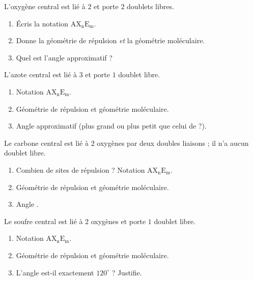 \documentclass[11pt,a4paper]{article}
\begin{document}
\newcommand{\AX}[2]{\ensuremath{\mathrm{AX_{#1}E_{#2}}}}
\begin{exo}[l'eau \ce{H2O}]
L'oxygène central est lié à $2$  et porte $2$ doublets libres.
\begin{enumerate}[label=\alph*)]
  \item Écris la notation \AX{n}{m}.
  \item Donne la géométrie de répulsion \emph{et} la géométrie moléculaire.
  \item Quel est l'angle  approximatif ?
\end{enumerate}
\end{exo}

\begin{exo}[l'ammoniac \ce{NH3}]
L'azote central est lié à $3$  et porte $1$ doublet libre.
\begin{enumerate}[label=\alph*)]
  \item Notation \AX{n}{m}.
  \item Géométrie de répulsion et géométrie moléculaire.
  \item Angle  approximatif (plus grand ou plus petit que celui de  ?).
\end{enumerate}
\end{exo}

\begin{exo}
Le carbone central est lié à $2$ oxygènes par deux doubles liaisons ; il n'a aucun doublet libre.
\begin{enumerate}[label=\alph*)]
  \item Combien de sites de répulsion ? Notation \AX{n}{m}.
  \item Géométrie de répulsion et géométrie moléculaire.
  \item Angle .
\end{enumerate}
\end{exo}

\begin{exo}
Le soufre central est lié à $2$ oxygènes et porte $1$ doublet libre.
\begin{enumerate}[label=\alph*)]
  \item Notation \AX{n}{m}.
  \item Géométrie de répulsion et géométrie moléculaire.
  \item L'angle  est-il exactement $120^\circ$ ? Justifie.
\end{enumerate}
\end{exo}
\end{document}
